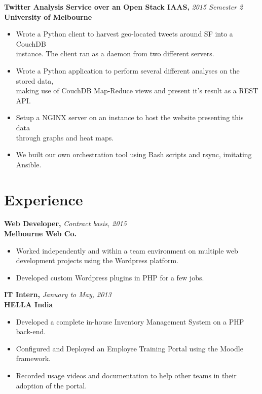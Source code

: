 \documentclass[a4paper,overlapped]{res}
\begin{document}
\begin{resume}
  \textbf{Twitter Analysis Service over an Open Stack IAAS,} 
  \hfill \textit{2015 Semester 2}\\
  \textbf{University of Melbourne}
  \begin{itemize}
  \item Wrote a Python client to harvest geo-located tweets around SF into a
    CouchDB \\
    instance. The client ran as a daemon from two different servers.
  \item Wrote a Python application to perform several different analyses on the
    stored data, \\
    making use of CouchDB Map-Reduce views and present it's result
    as a REST API.
  \item Setup a NGINX server on an instance to host the website presenting this
    data \\ through graphs and heat maps.
  \item We built our own orchestration tool using Bash scripts and rsync,
    imitating Ansible.
    
  \end{itemize}
  

  \section{Experience}

  \textbf{Web Developer,} \hfill \textit{Contract basis, 2015}\\
  \textbf{Melbourne Web Co.}
  \begin{itemize}
  \item Worked independently and within a team environment on multiple web 
    development projects using the Wordpress platform.
  \item Developed custom Wordpress plugins in PHP for a few jobs.  
  \end{itemize}

  \textbf{IT Intern,} \hfill \textit{January to May, 2013}\\
  \textbf{HELLA India}
  \begin{itemize}
  \item Developed a complete in-house Inventory Management System on a PHP
    back-end. 
  \item Configured and Deployed an Employee Training Portal using the
    Moodle framework.
  \item Recorded usage videos and documentation to help other teams in their
    adoption of the portal.
  \end{itemize}
  

\end{resume}
\end{document}
